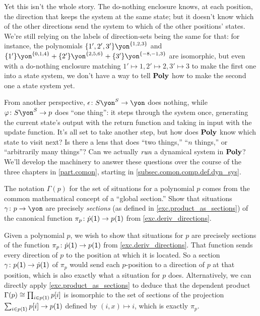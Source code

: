 \documentclass[Book-Poly]{subfiles}
\begin{document}
\begin{example}
Yet this isn't the whole story.
The do-nothing enclosure knows, at each position, the direction that keeps the system at the same state; but it doesn't know which of the other directions send the system to which of the other positions' states.
We're still relying on the labels of direction-sets being the same for that: for instance, the polynomials $\{1',2',3'\}\yon^{\{1,2,3\}}$ and $\{1'\}\yon^{\{0,1,4\}}+\{2'\}\yon^{\{2,5,6\}}+\{3'\}\yon^{\{-8,-1,3\}}$ are isomorphic, but even with a do-nothing enclosure matching $1'\mapsto1,2'\mapsto2,3'\mapsto3$ to make the first one into a state system, we don't have a way to tell $\mathbf{Poly}$ how to make the second one a state system yet.

From another perspective, $\epsilon\colon S\yon^S\to\yon$ does nothing, while $\varphi\colon S\yon^S\to p$ does ``one thing'': it steps through the system once, generating the current state's output with the return function and taking in input with the update function.
It's all set to take another step, but how does $\mathbf{Poly}$ know which state to visit next?
Is there a lens that does ``two things,'' ``$n$ things,'' or ``arbitrarily many things''?
Can we actually $\emph{run}$ a dynamical system in $\mathbf{Poly}$?
We'll develop the machinery to answer these questions over the course of the three chapters in \cref{part.comon}, starting in \cref{subsec.comon.comp.def.dyn_sys}.
\end{example}

\begin{exercise}
The notation $\Gamma(p)$ for the set of situations for a polynomial $p$ comes from the common mathematical concept of a ``global section.''
Show that situations $\gamma\colon p\to\yon$ are precisely \emph{sections} (as defined in \cref{exc.product_as_sections}) of the canonical function $\pi_p\colon\dot{p}(\textsf{1})\to p(\textsf{1})$ from \cref{exc.deriv_directions}.
\begin{solution}
Given a polynomial $p$, we wish to show that situations for $p$ are precisely sections of the function $\pi_p\colon\dot{p}(\textsf{1})\to p(\textsf{1})$ from \cref{exc.deriv_directions}.
That function sends every direction of $p$ to the position at which it is located.
So a section $\gamma\colon p(\textsf{1})\to\dot{p}(\textsf{1})$ of $\pi_p$ would send each $p$-position to a direction of $p$ at that position, which is also exactly what a situation for $p$ does.
Alternatively, we can directly apply \cref{exc.product_as_sections} to deduce that the dependent product $\Gamma(p)\cong\prod_{i \in p(\textsf{1})}p[i]$ is isomorphic to the set of sections of the projection $\sum_{i\in p(\textsf{1})}p[i]\to p(\textsf{1})$ defined by $(i,x)\mapsto i$, which is exactly $\pi_p$.
\end{solution}
\end{exercise}
\end{document}
